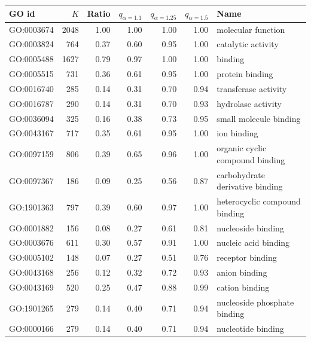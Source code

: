 \documentclass[11pt,twoside,a4paper]{book}
\begin{document}
\begin{table}
\begin{small}
\begin{center}
\begin{tabular}{lrrrrrl}
\textbf{GO id} & $K$ & \textbf{Ratio} & $q_{\alpha = 1.1}$ & $q_{\alpha = 1.25} $ & $q_{\alpha = 1.5}$ &  \textbf{Name} \\ \hline
GO:0003674  &  2048  &  1.00  & 1.00 & 1.00 & 1.00 &    molecular function \\ \hline
GO:0003824  &  764   &  0.37  & 0.60 & 0.95 & 1.00 &    catalytic activity \\ \hline
GO:0005488  &  1627  &  0.79  & 0.97 & 1.00 & 1.00 &    binding \\ \hline
GO:0005515  &  731   &  0.36  & 0.61 & 0.95 & 1.00 &   protein binding \\ \hline
GO:0016740  &  285   &  0.14  & 0.31 & 0.70 & 0.94 &   transferase activity \\ \hline
GO:0016787  &  290   &  0.14  & 0.31 & 0.70 & 0.93 &   hydrolase activity \\ \hline
GO:0036094  &  325   &  0.16  & 0.38 & 0.73 & 0.95 &    small molecule binding \\ \hline
GO:0043167  &  717   &  0.35  & 0.61 & 0.95 & 1.00 &    ion binding \\ \hline
GO:0097159  &  806   &  0.39  & 0.65 & 0.96 & 1.00 &    organic cyclic compound binding \\ \hline
GO:0097367  &  186   &  0.09  & 0.25 & 0.56 & 0.87 &   carbohydrate derivative binding \\ \hline
GO:1901363  &  797   &  0.39  & 0.60 & 0.97 & 1.00 &   heterocyclic compound binding \\ \hline
GO:0001882  &  156   &  0.08  & 0.27 & 0.61 & 0.81 &  nucleoside binding \\ \hline
GO:0003676  &  611   &  0.30  & 0.57 & 0.91 & 1.00 &    nucleic acid binding \\ \hline
GO:0005102  &  148   &  0.07  & 0.27 & 0.51 & 0.76 &    receptor binding \\ \hline
GO:0043168  &  256   &  0.12  & 0.32 & 0.72 & 0.93 &   anion binding \\ \hline
GO:0043169  &  520   &  0.25  & 0.47 & 0.88 & 0.99 &   cation binding \\ \hline
GO:1901265  &  279   &  0.14  & 0.40 & 0.71 & 0.94 &    nucleoside phosphate binding \\ \hline
GO:0000166  &  279   &  0.14  & 0.40 & 0.71 & 0.94 &    nucleotide binding \\ \hline

\end{tabular}
\end{center}
\end{small}
\end{table}
\end{document}
